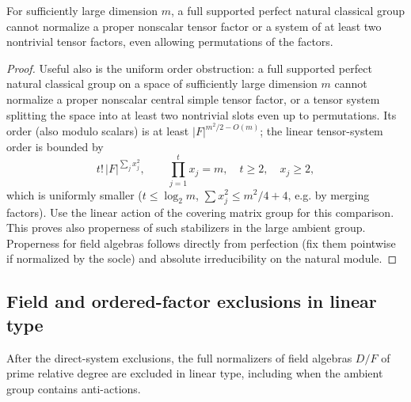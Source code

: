 \begin{lemma}\label{c:tensor-order}
For sufficiently large dimension \(m\), a full supported perfect natural classical group cannot normalize a proper nonscalar tensor factor or a system of at least two nontrivial tensor factors, even allowing permutations of the factors.
\end{lemma}

\begin{proof}
Useful also is the uniform order obstruction: a full supported perfect natural classical group on a space of sufficiently large dimension \(m\) cannot normalize a proper nonscalar central simple tensor factor, or a tensor system splitting the space into at least two nontrivial slots even up to permutations. Its order (also modulo scalars) is at least \(|F|^{m^2/2-O(m)}\); the linear tensor-system order is bounded by
\[
 t!\, |F|^{\sum_j x_j^2},\qquad \prod_{j=1}^t x_j=m,\quad t\ge2,\quad x_j\ge2 ,
\]
which is uniformly smaller (\(t\le\log_2 m\), \(\sum x_j^2\le m^2/4+4\), e.g. by merging factors). Use the linear action of the covering matrix group for this comparison. This proves also properness of such stabilizers in the large ambient group. Properness for field algebras follows directly from perfection (fix them pointwise if normalized by the socle) and absolute irreducibility on the natural module.
\end{proof}

\subsection{Field and ordered-factor exclusions in linear type}

\begin{proposition}\label{c:linear-fields}
After the direct-system exclusions, the full normalizers of field algebras \(D/F\) of prime relative degree are excluded in linear type, including when the ambient group contains anti-actions.
\end{proposition}

